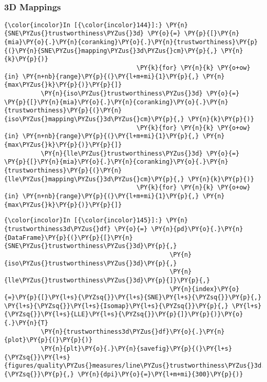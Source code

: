     \begin{center}
    \end{center}
    { \hspace*{\fill} \\}

    \subsubsection{3D Mappings}\label{d-mappings}

    \begin{Verbatim}[commandchars=\\\{\}]
{\color{incolor}In [{\color{incolor}144}]:} \PY{n}{SNE\PYZus{}trustworthiness\PYZus{}3d} \PY{o}{=} \PY{p}{[}\PY{n}{mia}\PY{o}{.}\PY{n}{coranking}\PY{o}{.}\PY{n}{trustworthiness}\PY{p}{(}\PY{n}{SNE\PYZus{}mapping\PYZus{}3d\PYZus{}cm}\PY{p}{,} \PY{n}{k}\PY{p}{)}
                                    \PY{k}{for} \PY{n}{k} \PY{o+ow}{in} \PY{n+nb}{range}\PY{p}{(}\PY{l+m+mi}{1}\PY{p}{,} \PY{n}{max\PYZus{}k}\PY{p}{)}\PY{p}{]}
          \PY{n}{iso\PYZus{}trustworthiness\PYZus{}3d} \PY{o}{=} \PY{p}{[}\PY{n}{mia}\PY{o}{.}\PY{n}{coranking}\PY{o}{.}\PY{n}{trustworthiness}\PY{p}{(}\PY{n}{iso\PYZus{}mapping\PYZus{}3d\PYZus{}cm}\PY{p}{,} \PY{n}{k}\PY{p}{)}
                                    \PY{k}{for} \PY{n}{k} \PY{o+ow}{in} \PY{n+nb}{range}\PY{p}{(}\PY{l+m+mi}{1}\PY{p}{,} \PY{n}{max\PYZus{}k}\PY{p}{)}\PY{p}{]}
          \PY{n}{lle\PYZus{}trustworthiness\PYZus{}3d} \PY{o}{=} \PY{p}{[}\PY{n}{mia}\PY{o}{.}\PY{n}{coranking}\PY{o}{.}\PY{n}{trustworthiness}\PY{p}{(}\PY{n}{lle\PYZus{}mapping\PYZus{}3d\PYZus{}cm}\PY{p}{,} \PY{n}{k}\PY{p}{)}
                                    \PY{k}{for} \PY{n}{k} \PY{o+ow}{in} \PY{n+nb}{range}\PY{p}{(}\PY{l+m+mi}{1}\PY{p}{,} \PY{n}{max\PYZus{}k}\PY{p}{)}\PY{p}{]}
\end{Verbatim}

    \begin{Verbatim}[commandchars=\\\{\}]
{\color{incolor}In [{\color{incolor}145}]:} \PY{n}{trustworthiness3d\PYZus{}df} \PY{o}{=} \PY{n}{pd}\PY{o}{.}\PY{n}{DataFrame}\PY{p}{(}\PY{p}{[}\PY{n}{SNE\PYZus{}trustworthiness\PYZus{}3d}\PY{p}{,}
                                             \PY{n}{iso\PYZus{}trustworthiness\PYZus{}3d}\PY{p}{,}
                                             \PY{n}{lle\PYZus{}trustworthiness\PYZus{}3d}\PY{p}{]}\PY{p}{,}
                                             \PY{n}{index}\PY{o}{=}\PY{p}{[}\PY{l+s}{\PYZsq{}}\PY{l+s}{SNE}\PY{l+s}{\PYZsq{}}\PY{p}{,} \PY{l+s}{\PYZsq{}}\PY{l+s}{Isomap}\PY{l+s}{\PYZsq{}}\PY{p}{,} \PY{l+s}{\PYZsq{}}\PY{l+s}{LLE}\PY{l+s}{\PYZsq{}}\PY{p}{]}\PY{p}{)}\PY{o}{.}\PY{n}{T}
          \PY{n}{trustworthiness3d\PYZus{}df}\PY{o}{.}\PY{n}{plot}\PY{p}{(}\PY{p}{)}
          \PY{n}{plt}\PY{o}{.}\PY{n}{savefig}\PY{p}{(}\PY{l+s}{\PYZsq{}}\PY{l+s}{figures/quality\PYZus{}measures/line\PYZus{}trustworthiness\PYZus{}3d.png}\PY{l+s}{\PYZsq{}}\PY{p}{,} \PY{n}{dpi}\PY{o}{=}\PY{l+m+mi}{300}\PY{p}{)}
\end{Verbatim}

